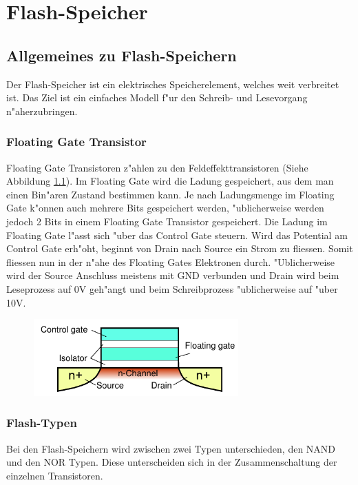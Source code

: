 \chapter{Flash-Speicher\label{chapter:flash}}
\begin{refsection}

\section{Allgemeines zu Flash-Speichern}
Der Flash-Speicher ist ein elektrisches Speicherelement, welches
weit verbreitet ist.
Das Ziel ist ein einfaches Modell f"ur den Schreib- und Lesevorgang
n"aherzubringen.

\subsection{Floating Gate Transistor}
Floating Gate Transistoren z"ahlen zu den Feldeffekttransistoren
(Siehe Abbildung \ref{skript:Floatinggatetransistor}).
Im Floating Gate wird die Ladung gespeichert, aus dem man einen Bin"aren
Zustand bestimmen kann.
Je nach Ladungsmenge im Floating Gate k"onnen auch mehrere Bits gespeichert
werden, "ublicherweise werden jedoch 2 Bits in einem Floating Gate
Transistor gespeichert.
Die Ladung im Floating Gate l"asst sich "uber das Control Gate steuern.
Wird das Potential am Control Gate erh"oht, beginnt von Drain nach
Source ein Strom zu fliessen.
Somit fliessen nun in der n"ahe des Floating Gates Elektronen durch.
"Ublicherweise wird der Source Anschluss meistens mit GND verbunden und
Drain wird beim Leseprozess auf 0V geh"angt und beim Schreibprozess
"ublicherweise auf "uber 10V.

\begin{figure}
\centering
\includegraphics[width=0.7\textwidth]{flash/graphics/Floatinggate.pdf}
\cite{Abbildung eines Floting Gate Transistor}
\label{skript:Floatinggatetransistor}
\end{figure}

\subsection{Flash-Typen}
Bei den Flash-Speichern wird zwischen zwei Typen unterschieden, den NAND
und den NOR Typen.
Diese unterscheiden sich in der Zusammenschaltung der einzelnen Transistoren.


\end{refsection}
